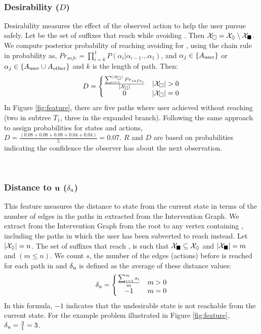 ~\subsubsection{Desirability ($D$)}
Desirability measures the effect of the observed action to help the user pursue \desired safely. 
Let \SuffixesSafe be the set of suffixes that reach \desired while avoiding \undesired. Then $\mathcal{X}_{\square} =  \mathcal{X}_\Diamond\setminus\mathcal{X}_{\blacksquare}$.
We compute  posterior probability of reaching \desired avoiding \undesired for \SuffixesSafe, using the chain rule in probability as, $Pr_{safe}=\prod_{i=k}^{1}P(\alpha_i|\alpha_{i-1}\ldots \alpha_1)$, and $\alpha_{j} \in \lbrace A_{\textnormal{user}}\rbrace$ or $\alpha_j\in\lbrace A_{\textnormal{user}}\cup A_{\textnormal{other}}\rbrace$ and $k$ is the length of path. Then:
\begin{equation*} 
D = \left\{\begin{matrix}
\frac{\sum_{i=1}^{|\SuffixesSafe|}Pr_{safe_i}}{|\SuffixesSafe|} & |\SuffixesSafe|>0\\ 
0 &  |\SuffixesSafe|=0
\end{matrix}\right.
\end{equation*} 
In Figure \ref{fig:feature}, there are five paths where user achieved \desired  without reaching \undesired (two in subtree $T_1$, three in the expanded branch). 
Following the same approach to assign probabilities for states and actions, $D= \frac{(0.08+0.08+0.08+0.04+0.04)}{5} = 0.07$.
$R$ and $D$ are based on probabilities indicating the confidence the observer has about the next observation. 


~\subsubsection{Distance to $\boldsymbol{\mathrm{u}}$ ($\delta_\mathrm{u}$)} 
This feature measures the distance to state \undesired from the current state in terms of the number of edges in the paths in \Suffixes extracted from the Intervention Graph. 
We extract \Suffixes from the Intervention Graph from the root to any vertex containing \desired, including the paths in which the user has been subverted to reach \undesired instead. 
Let $\left | \mathcal{X}_\Diamond \right |=n$. 
The set of suffixes that reach \undesired, \SuffixesUnsafe is such that $\mathcal{X}_{\blacksquare} \subseteq \mathcal{X}_\Diamond$ and $\left | \mathcal{X}_{\blacksquare} \right |=m$ and $(m\leq n)$.
We count  $s$, the number of the edges (actions) before \undesired is reached for each path in \SuffixesUnsafe and $\delta_\mathrm{u}$ is defined as the average of these distance values:
\begin{equation*} 
\delta_\mathrm{u} = \left\{\begin{matrix}
\frac{\sum_{i=1}^{m}s_i}{m} & m>0\\ 
-1 &  m=0
\end{matrix}\right.
\end{equation*} 
In this formula, $-1$ indicates that the undesirable state is not reachable from the current state. For the example problem illustrated in Figure \ref{fig:feature}, $\delta_\mathrm{u}=\frac{3}{1}=3$.

